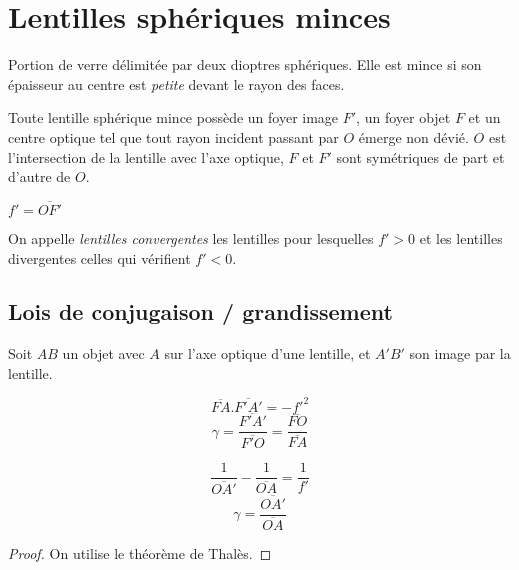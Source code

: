 \documentclass[11pt]{article}
\theoremstyle{cstyle}{\newtheorem{definition}{Définition}[section]}
\theoremstyle{cstyle}{\newtheorem{proposition}[definition]{Propriété}}
\theoremstyle{cstyle}{\newtheorem{theorem}[definition]{Théorème}}
\theoremstyle{mystyle}{\newtheorem{lemma}[definition]{Lemme}}
\theoremstyle{mystyle}{\newtheorem{corollary}[definition]{Corollaire}}
\theoremstyle{mystyle}{\newtheorem*{remark}{Remarque}}
\theoremstyle{mystyle}{\newtheorem*{remarks}{Remarques}}
\theoremstyle{mystyle}{\newtheorem*{example}{Exemple}}
\theoremstyle{mystyle}{\newtheorem*{examples}{Exemples}}
\theoremstyle{definition}{\newtheorem*{exercise}{Exercice}}
\theoremstyle{mystyle}{\newtheorem*{methode}{Méthode}}
\theoremstyle{cstyle}{\newtheorem*{cthm}{}}
\theoremstyle{warn}
\begin{document}
	\hfill
	\begin{minipage}[t]{0.46\textwidth}
		\section{Lentilles sphériques minces}
		
		\begin{definition}
			Portion de verre délimitée par deux dioptres sphériques. Elle est mince si son épaisseur au centre est \textit{petite} devant le rayon des faces.
		\end{definition}
	
		\begin{proposition}
			Toute lentille sphérique mince possède un foyer image \(F'\), un foyer objet \(F\) et un centre optique tel que tout rayon incident passant par \(O\) émerge non dévié. \(O\) est l'intersection de la lentille avec l'axe optique, \(F\) et \(F'\) sont symétriques de part et d'autre de \(O\).
		\end{proposition}
	
		\begin{definition}
			\(f' = \overline{OF'}\)
		\end{definition}
	
		\begin{definition}
			On appelle \textit{lentilles convergentes} les lentilles pour lesquelles \(f' > 0\) et les lentilles divergentes celles qui vérifient \(f' < 0\).
		\end{definition}
	
		\subsection{Lois de conjugaison / grandissement}
		Soit \(AB\) un objet avec \(A\) sur l'axe optique d'une lentille, et \(A'B'\) son image par la lentille.
		\begin{proposition}
			\[
				\overline{FA}.\overline{F'A'} = {-f'}^{2}
			\]
			\[
				\gamma = \frac{\overline{F'A'}}{\overline{F'O}} = \frac{\overline{FO}}{\overline{FA}} 
			\]
		\end{proposition}
	
		\begin{proposition}
			\[
				\frac{1}{\overline{OA'}} - \frac{1}{\overline{OA}} = \frac{1}{f'}
			\]
			\[
				\gamma = \frac{\overline{OA'}}{\overline{OA}}
			\]
		\end{proposition}
		\begin{proof}
			On utilise le théorème de Thalès.
		\end{proof}
	\end{minipage}
\end{document}
